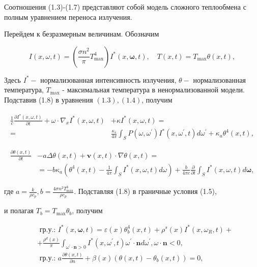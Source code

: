 \documentclass[10pt]{article}
\begin{document}
Соотношения (1.3)-(1.7) представляют собой модель сложного теплообмена с полным уравнением переноса излучения.

Перейдем к безразмерным величинам. Обозначим

$$
I(x, \omega, t)=\left(\frac{\sigma n^{2}}{\pi} T_{\max }^{4}\right) I^{*}(x, \boldsymbol{\omega}, t), \quad T(x, t)=T_{\max } \theta(x, t),
$$

Здесь $I^{*}-$ нормализованная интенсивность излучения, $\theta-$ нормализованная температура, $T_{\max }$ - максимальная температура в ненормализованной модели. Подставив (1.8) в уравнения $(1.3),(1.4)$, получим

$$
\begin{aligned}
\frac{1}{c} \frac{\partial I^{*}(x, \omega, t)}{\partial t}+\omega \cdot \nabla_{x} I^{*}(x, \omega, t) &+\kappa I^{*}(x, \omega, t)=\\
=& \frac{\kappa_{s}}{4 \pi} \int_{S} P\left(\omega, \omega^{\prime}\right) I^{*}\left(x, \omega^{\prime}, t\right) d \omega^{\prime}+\kappa_{a} \theta^{4}(x, t),
\end{aligned}
$$

$$
\begin{aligned}
\frac{\partial \theta(x, t)}{\partial t} &-a \Delta \theta(x, t)+\mathbf{v}(x, t) \cdot \nabla \theta(x, t)=\\
&=-b \kappa_{a}\left(\theta^{4}(x, t)-\frac{1}{4 \pi} \int_{S} I^{*}(x, \omega, t) d \omega\right)+\frac{b}{4 \pi c} \frac{\partial}{\partial t} \int_{S} I^{*}(x, \omega, t) d \boldsymbol{\omega},
\end{aligned}
$$

где $a=\frac{k}{\rho c_{p}}, b=\frac{4 \sigma n^{2} T_{\max }^{3}}{\rho c_{p}}$. Подставляя (1.8) в граничные условия (1.5),

и полагая $T_{b}=T_{\max } \theta_{b}$, получим

$$
\begin{aligned}
& \text { гр.у.: } I^{*}(x, \boldsymbol{\omega}, t)=\varepsilon(x) \theta_{b}^{4}(x, t)+\rho^{s}(x) I^{*}\left(x, \omega_{R}, t\right)+ \\
& +\frac{\rho^{d}(x)}{\pi} \int_{\omega^{\prime} \cdot \mathbf{n}>0} I^{*}\left(x, \omega^{\prime}, t\right) \omega^{\prime} \cdot \mathbf{n} d \omega^{\prime}, \omega \cdot \mathbf{n}<0, \\
& \text { гр.у.: } a \frac{\partial \theta(x, t)}{\partial n}+\beta(x)\left(\theta(x, t)-\theta_{b}(x, t)\right)=0 \text {, }
\end{aligned}
$$
\end{document}
